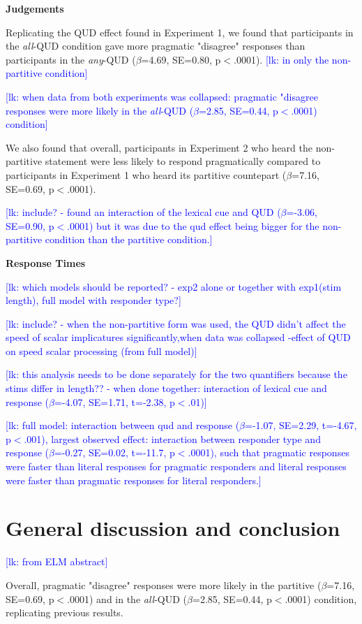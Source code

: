 \documentclass[10pt,letterpaper]{article}
\newcommand{\lk}[1]{\textcolor{Blue}{[lk: #1]}}
\begin{document}
\noindent \textbf{Judgements}

Replicating the QUD effect found in Experiment 1, we found that participants in the \textit{all}-QUD condition gave more pragmatic "disagree" responses than participants in the \textit{any}-QUD ($\beta$=4.69, SE=0.80, p$<$.0001). \lk{in only the non-partitive condition}

\lk{when data from both experiments was collapsed: pragmatic "disagree responses were more likely in the \textit{all}-QUD ($\beta$=2.85, SE=0.44, p$<$.0001) condition}

We also found that overall, participants in Experiment 2 who heard the non-partitive statement were less likely to respond pragmatically compared to participants in Experiment 1 who heard its partitive countepart ($\beta$=7.16, SE=0.69, p$<$.0001).

\lk{include? - found an interaction of the lexical cue and QUD ($\beta$=-3.06, SE=0.90, p$<$.0001) but it was due to the qud effect being bigger for the non-partitive condition than the partitive condition.}

\noindent \textbf{Response Times}

\lk{which models should be reported? - exp2 alone or together with exp1(stim length), full model with responder type?}

\lk{include? - when the non-partitive form was used, the QUD didn't affect the speed of scalar implicatures significantly,when data was collapsed -effect of QUD on speed scalar processing (from full model)}  

\lk{this analysis needs to be done separately for the two quantifiers because the stims differ in length?? - when done together: interaction of lexical cue and response ($\beta$=-4.07, SE=1.71, t=-2.38, p$<$.01)}

\lk{full model: interaction between qud and response ($\beta$=-1.07, SE=2.29, t=-4.67, p$<$.001), largest observed effect: interaction between responder type and response ($\beta$=-0.27, SE=0.02, t=-11.7, p$<$.0001), such that pragmatic responses were faster than literal responses for pragmatic responders and literal responses were faster than pragmatic responses for literal responders.}

\section{General discussion and conclusion}
\lk{from ELM abstract}

Overall, pragmatic "disagree" responses were more likely in the partitive ($\beta$=7.16, SE=0.69, p$<$.0001) and in the \textit{all}-QUD ($\beta$=2.85, SE=0.44, p$<$.0001) condition, replicating previous results.
\end{document}
